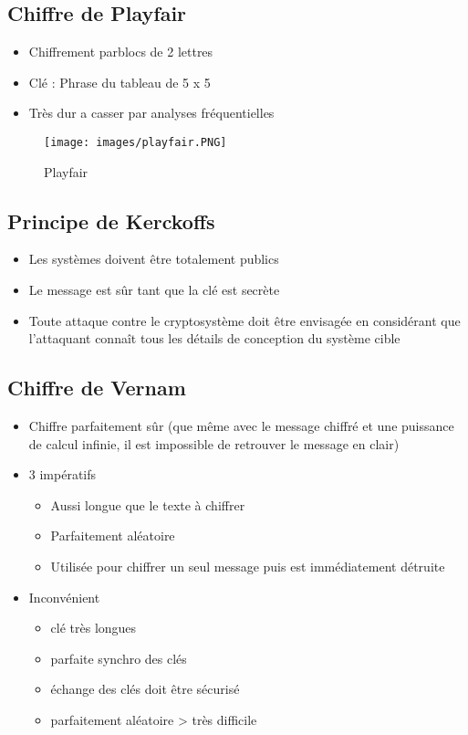 \documentclass[a4paper]{article}
\begin{document}
\subsection{Chiffre de Playfair}
\begin{itemize}[label=\textbullet, font=\Large]
    \item Chiffrement parblocs de 2 lettres
    \item Clé : Phrase du tableau de 5 x 5
    \item Très dur a casser par analyses fréquentielles
\end{itemize}
\begin{figure}[H]
    \centering
    \texttt{[image: images/playfair.PNG]}
    \caption{Playfair}
\end{figure}

\subsection{Principe de Kerckoffs}
\begin{itemize}[label=\textbullet, font=\Large]
    \item Les systèmes doivent être totalement publics
    \item Le message est sûr tant que la clé est secrète
    \item Toute attaque contre le cryptosystème doit être envisagée en considérant que l'attaquant connaît tous les détails de conception du système cible
\end{itemize}

\subsection{Chiffre de Vernam}
\begin{itemize}[label=\textbullet, font=\Large]
    \item Chiffre parfaitement sûr (que même avec le message chiffré et une puissance de calcul infinie, il est impossible de retrouver le message en clair)
    \item 3 impératifs
    \begin{itemize}[label=, font=\scriptsize]
        \item Aussi longue que le texte à chiffrer
        \item Parfaitement aléatoire
        \item Utilisée pour chiffrer un seul message puis est immédiatement détruite
    \end{itemize}
    \item Inconvénient
    \begin{itemize}[label=, font=\scriptsize]
        \item clé très longues
        \item parfaite synchro des clés
        \item échange des clés doit être sécurisé
        \item parfaitement aléatoire > très difficile
    \end{itemize}
\end{itemize}
\end{document}
